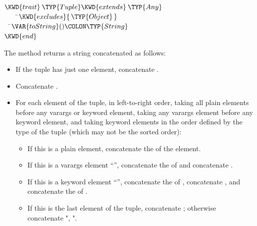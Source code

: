 \begin{Fortress}
\(\KWD{trait}\:\TYP{Tuple} \KWD{extends}\:\TYP{Any}\)\\
{\tt~~~~}\pushtabs\=\+\(    \KWD{excludes} \{\,\TYP{Object}\,\}\)\-\\\poptabs
{\tt~~}\pushtabs\=\+\(  \VAR{toString}()\COLON \TYP{String}\)\-\\\poptabs
\(\KWD{end}\)
\end{Fortress}



The  method returns a string 
concatenated as follows:
\begin{itemize}
\item If the tuple has just one element, concatenate
.
\item Concatenate .
\item For each element of the tuple, in left-to-right order,
     taking all plain elements before any varargs or keyword
     element, taking any varargs element before any keyword
     element, and taking keyword elements in the order defined
     by the type of the tuple (which may not be the sorted order):
     \begin{itemize}
     \item If this is a plain element,
 concatenate the  of the element.
     \item If this is a varargs element ``'',
 concatenate the  of  and
 concatenate .
     \item If this is a keyword element ``'',
 concatenate the  of ,
 concatenate , and
 concatenate the  of .
     \item If this is the last element of the tuple,
 concatenate ;
          otherwise concatenate ", ".
     \end{itemize}
\end{itemize}
